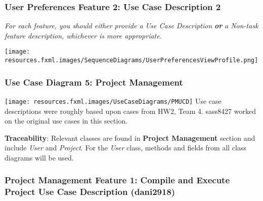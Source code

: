 \documentclass[twoside,letterpaper]{article}
\begin{document}
\subsubsection[User Preferences Feature 2: Use Case Description 2]{\rmfamily\bfseries\color{black}
	User Preferences Feature 2: Use Case Description 2}
\hypertarget{RefHeading22059017292}{}
\bigskip

{\color{black}
	\foreignlanguage{english}{\textit{For each feature, you should either provide a Use Case Description
		}}\foreignlanguage{english}{\textbf{\textit{or}}}\foreignlanguage{english}{\textit{ a Non-task feature description,
		whichever is more appropriate.}}}

\texttt{[image: resources.fxml.images/SequenceDiagrams/UserPreferencesViewProfile.png]}

\newpage

\subsubsection[Use Case Diagram 5: Project Management (dani2918)]{\rmfamily\bfseries\color{black}
	Use Case Diagram 5: Project Management}

\bigskip
	
	\texttt{[image: resources.fxml.images/UseCaseDiagrams/PMUCD]} \vspace{5cm}
	\; \newline
	Use case descriptions were roughly based upon cases from HW2, Team 4. sass8427 worked on the original use cases in this section.\newline

\noindent \textbf{Traceability}:
Relevant classes are found in \textbf{Project Management} section and include \textit{User} and \textit{Project}. For the \textit{User} class, methods and fields from all class diagrams will be used.

\newpage

\subsubsection[Project Management Feature 1: Use Case Description 1: Compile and execute project (dani2918)]{\rmfamily\bfseries\color{black}
	Project Management Feature 1: Compile and Execute Project Use Case Description (dani2918) }
\hypertarget{RefHeading22059017292}{}
\label{pm:uc1}
\end{document}
